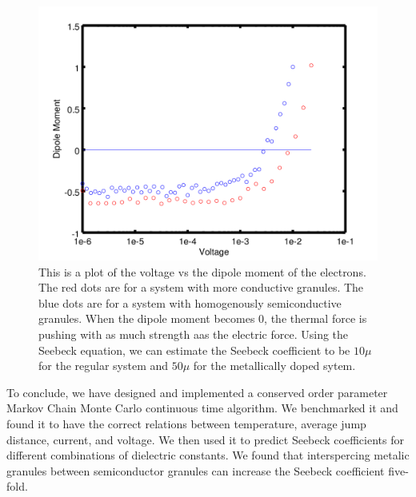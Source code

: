 \begin{figure}[htbp]
\begin{center}
\includegraphics[scale=.50]{DipoleCompare.png}
\caption{This is a plot of the voltage vs the dipole moment of the electrons. The red dots are for a system with more conductive granules. The blue dots are for a system with homogenously semiconductive granules. When the dipole moment becomes 0, the thermal force is pushing with as much strength aas the electric force. Using the Seebeck equation, we can estimate the Seebeck coefficient to be $10 \mu$ for the regular system and $50 \mu$ for the metallically doped sytem. }
\label{TvJ}
\end{center}
\end{figure}

To conclude, we have designed and implemented a conserved order parameter Markov Chain Monte Carlo continuous time algorithm. We benchmarked it and found it to have the correct relations between temperature, average jump distance, current, and voltage. We then used it to predict Seebeck coefficients for different combinations of dielectric constants. We found that interspercing metalic granules between semiconductor granules can increase the Seebeck coefficient five-fold.
